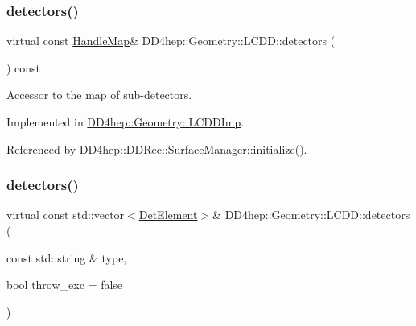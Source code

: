 \hypertarget{class_d_d4hep_1_1_geometry_1_1_l_c_d_d_ad06f71146140dc2682bc586ba7bffeaf}{}\label{class_d_d4hep_1_1_geometry_1_1_l_c_d_d_ad06f71146140dc2682bc586ba7bffeaf} 
\subsubsection{\texorpdfstring{detectors()}{detectors()}\hspace{0.1cm}{\footnotesize\ttfamily [1/4]}}
{\footnotesize\ttfamily virtual const \hyperlink{class_d_d4hep_1_1_geometry_1_1_l_c_d_d_a05cb11e7355772c7b0794bcca59bf477}{Handle\+Map}\& D\+D4hep\+::\+Geometry\+::\+L\+C\+D\+D\+::detectors (\begin{DoxyParamCaption}{ }\end{DoxyParamCaption}) const\hspace{0.3cm}{\ttfamily [pure virtual]}}



Accessor to the map of sub-\/detectors. 



Implemented in \hyperlink{class_d_d4hep_1_1_geometry_1_1_l_c_d_d_imp_aef76d7cbfc6be684d48d1bc1801f9319}{D\+D4hep\+::\+Geometry\+::\+L\+C\+D\+D\+Imp}.



Referenced by D\+D4hep\+::\+D\+D\+Rec\+::\+Surface\+Manager\+::initialize().

\hypertarget{class_d_d4hep_1_1_geometry_1_1_l_c_d_d_a0f8e72265d7c6fd7d0dcdd293e13031f}{}\label{class_d_d4hep_1_1_geometry_1_1_l_c_d_d_a0f8e72265d7c6fd7d0dcdd293e13031f} 
\subsubsection{\texorpdfstring{detectors()}{detectors()}\hspace{0.1cm}{\footnotesize\ttfamily [2/4]}}
{\footnotesize\ttfamily virtual const std\+::vector$<$\hyperlink{class_d_d4hep_1_1_geometry_1_1_det_element}{Det\+Element}$>$\& D\+D4hep\+::\+Geometry\+::\+L\+C\+D\+D\+::detectors (\begin{DoxyParamCaption}\item[{const std\+::string \&}]{type,  }\item[{bool}]{throw\+\_\+exc = {\ttfamily false} }\end{DoxyParamCaption})\hspace{0.3cm}{\ttfamily [pure virtual]}}



